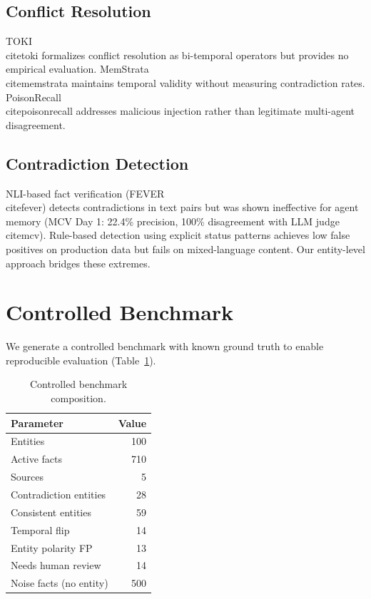 \documentclass{article}
\begin{document}
\subsection{Conflict Resolution}
TOKI~\\cite{toki} formalizes conflict resolution as bi-temporal operators but provides no empirical evaluation. MemStrata~\\cite{memstrata} maintains temporal validity without measuring contradiction rates. PoisonRecall~\\cite{poisonrecall} addresses malicious injection rather than legitimate multi-agent disagreement.

\subsection{Contradiction Detection}
NLI-based fact verification (FEVER~\\cite{fever}) detects contradictions in text pairs but was shown ineffective for agent memory (MCV Day 1: 22.4\% precision, 100\% disagreement with LLM judge~\\cite{mcv}). Rule-based detection using explicit status patterns achieves low false positives on production data but fails on mixed-language content. Our entity-level approach bridges these extremes.

\section{Controlled Benchmark}
\label{sec:benchmark}

We generate a controlled benchmark with known ground truth to enable reproducible evaluation (Table~\ref{tab:benchmark}).

\begin{table}[h]
\centering
\caption{Controlled benchmark composition.}
\begin{tabular}{lr}
\toprule
Parameter & Value \\
\midrule
Entities & 100 \\
Active facts & 710 \\
Sources & 5 \\
Contradiction entities & 28 \\
Consistent entities & 59 \\
Temporal flip & 14 \\
Entity polarity FP & 13 \\
Needs human review & 14 \\
Noise facts (no entity) & 500 \\
\bottomrule
\end{tabular}
\label{tab:benchmark}
\end{table}
\end{document}
